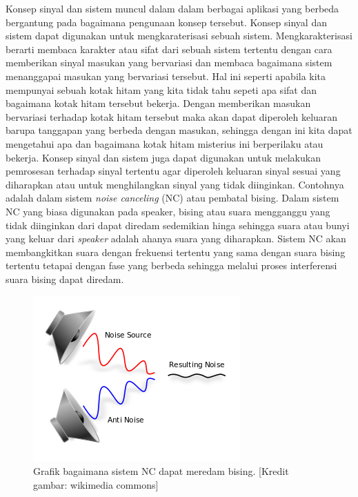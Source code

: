 Konsep sinyal dan sistem muncul dalam dalam berbagai aplikasi yang berbeda bergantung pada bagaimana pengunaan konsep tersebut. Konsep sinyal dan sistem dapat digunakan untuk mengkaraterisasi sebuah sistem. Mengkarakterisasi berarti membaca karakter atau sifat dari sebuah sistem tertentu dengan cara memberikan sinyal masukan yang bervariasi dan membaca bagaimana sistem menanggapai masukan yang bervariasi tersebut. Hal ini seperti apabila kita mempunyai sebuah kotak hitam yang kita tidak tahu sepeti apa sifat dan bagaimana kotak hitam tersebut bekerja. Dengan memberikan masukan bervariasi terhadap kotak hitam tersebut maka akan dapat diperoleh keluaran barupa tanggapan yang berbeda dengan masukan, sehingga dengan ini kita dapat mengetahui apa dan bagaimana kotak hitam misterius ini berperilaku atau bekerja. Konsep sinyal dan sistem juga dapat digunakan untuk melakukan pemrosesan terhadap sinyal tertentu agar diperoleh keluaran sinyal sesuai yang diharapkan atau untuk menghilangkan sinyal yang tidak diinginkan. Contohnya adalah dalam sistem \textit{noise canceling} (NC) atau pembatal bising. Dalam sistem NC yang biasa digunakan pada speaker, bising atau suara mengganggu yang tidak diinginkan dari dapat diredam sedemikian hinga sehingga suara atau bunyi yang keluar dari \textit{speaker} adalah ahanya suara yang diharapkan. Sistem NC akan membangkitkan suara dengan frekuensi tertentu yang sama dengan suara bising tertentu tetapai dengan fase yang berbeda sehingga melalui proses interferensi suara bising dapat diredam. 

\begin{figure}[!h]
\centering
\includegraphics[scale=0.7]{pict/300px-Active_Noise_Reduction}
\caption{Grafik bagaimana sistem NC dapat meredam bising.  [Kredit gambar: wikimedia commons]}\label{NC}
\end{figure}
     
